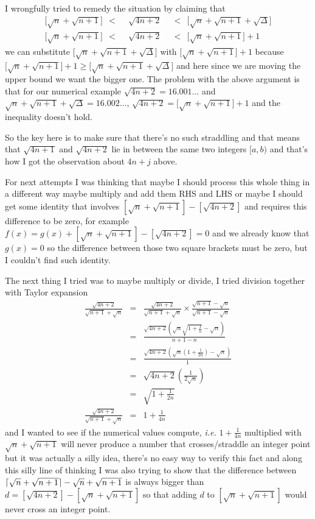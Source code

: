 \documentclass[aps,preprint,preprintnumbers,nofootinbib,showpacs,prd]{revtex4-1}
\newcommand{\ie}{{\it i.e.} }
\newcommand{\nbea}{\begin{eqnarray*}}
\newcommand{\neea}{\end{eqnarray*}}
\DeclarePairedDelimiter{\ceil}{\lceil}{\rceil}
\begin{document}
I wrongfully tried to remedy the situation by claiming that
%
\nbea
\lbrack \sqrt{n} + \sqrt{n+1} \rbrack ~~<~~ & \sqrt{4n + 2} & ~~<~~ \lbrack \sqrt{n} + \sqrt{n+1} + \sqrt{\Delta}\rbrack  \\
\lbrack \sqrt{n} + \sqrt{n+1} \rbrack ~~<~~ & \sqrt{4n + 2} & ~~<~~ \lbrack \sqrt{n} + \sqrt{n+1} \rbrack + 1
\neea
%
we can substitute $\lbrack \sqrt{n} + \sqrt{n+1} + \sqrt{\Delta}\rbrack$ with $\lbrack \sqrt{n} + \sqrt{n+1}\rbrack+1$ because $\lbrack \sqrt{n} + \sqrt{n+1} \rbrack + 1 \ge \lbrack \sqrt{n} + \sqrt{n+1} + \sqrt{\Delta} \rbrack$ and here since we are moving the upper bound we want the bigger one. The problem with the above argument is that for our numerical example $\sqrt{4n + 2} = 16.001\ldots$ and $\sqrt{n} + \sqrt{n+1} + \sqrt{\Delta} = 16.002\ldots$, $\sqrt{4n + 2} = \lbrack \sqrt{n} + \sqrt{n+1} \rbrack + 1$ and the inequality doesn't hold.

So the key here is to make sure that there's no such straddling and that means that $\sqrt{4n+1}$ and $\sqrt{4n+2}$ lie in between the same two integers $[a,b)$ and that's how I got the observation about $4n+j$ above.

For next attempts I was thinking that maybe I should process this whole thing in a different way maybe multiply and add them RHS and LHS or maybe I should get some identity that involves $[\sqrt{n}+\sqrt{n+1}]-[\sqrt{4n+2}]$ and requires this difference to be zero, for example $f(x) = g(x) + [\sqrt{n}+\sqrt{n+1}]-[\sqrt{4n+2}] = 0$ and we already know that $g(x)=0$ so the difference between those two square brackets must be zero, but I couldn't find such identity.

The next thing I tried was to maybe multiply or divide, I tried division together with Taylor expansion
%
\nbea
\frac{\sqrt{4n+2}}{\sqrt{n+1} + \sqrt{n}} & = & \frac{\sqrt{4n+2}}{\sqrt{n+1} + \sqrt{n}} \times \frac{\sqrt{n+1} - \sqrt{n}}{\sqrt{n+1} - \sqrt{n}} \\
& = & \frac{\sqrt{4n+2}\left (\sqrt{n}\sqrt{1+\frac{1}{n}} - \sqrt{n}\right)}{n+1 - n} \\
& = & \frac{\sqrt{4n+2}\left (\sqrt{n}\left ( 1 + \frac{1}{2n}\right ) - \sqrt{n}\right)}{1} \\
& = & \sqrt{4n+2}\left (\frac{1}{2\sqrt{n}}\right ) \\
& = & \sqrt{1 + \frac{1}{2n}} \\
\frac{\sqrt{4n+2}}{\sqrt{n+1} + \sqrt{n}} & = & 1 + \frac{1}{4n}
\neea
%
and I wanted to see if the numerical values compute, \ie $1 + \frac{1}{4n}$ multiplied with $\sqrt{n}+\sqrt{n+1}$ will never produce a number that crosses/straddle an integer point but it was actually a silly idea, there's no easy way to verify this fact and along this silly line of thinking I was also trying to show that the difference between $\ceil{\sqrt{n} + \sqrt{n+1}} - \sqrt{n} + \sqrt{n+1}$ is always bigger than $d = [\sqrt{4n+2}] - [\sqrt{n} + \sqrt{n+1}]$ so that adding $d$ to $[\sqrt{n}+\sqrt{n+1}]$ would never cross an integer point.
\end{document}
